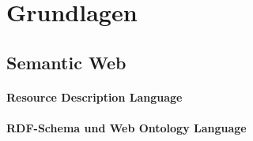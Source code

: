 
\chapter{Grundlagen} %
\label{cha:grundlagen}

\section{Semantic Web} %
\label{sec:semantic_web}

\subsubsection{Resource Description Language} %
\label{ssub:resource_description_language}


\subsubsection{RDF-Schema und Web Ontology Language} %
\label{ssub:rdf_schema_und_web_ontology_language}





